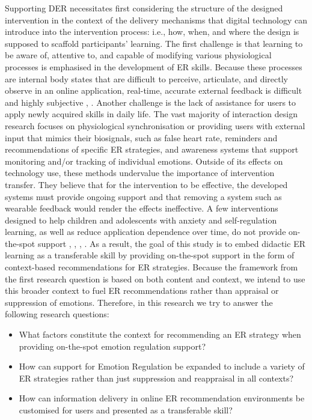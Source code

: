 Supporting DER necessitates first considering the structure of the designed intervention in the context of the delivery mechanisms that digital technology can introduce into the intervention process: i.e., how, when, and where the design is supposed to scaffold participants' learning. The first challenge is that learning to be aware of, attentive to, and capable of modifying various physiological processes is emphasised in the development of ER skills. Because these processes are internal body states that are difficult to perceive, articulate, and directly observe in an online application, real-time, accurate external feedback is difficult and highly subjective \cite{slovak2022designing}, \cite{tag2022emotion}. Another challenge is the lack of assistance for users to apply newly acquired skills in daily life. The vast majority of interaction design research focuses on physiological synchronisation or providing users with external input that mimics their biosignals, such as false heart rate, reminders and recommendations of specific ER strategies, and awareness systems that support monitoring and/or tracking of individual emotions. Outside of its effects on technology use, these methods undervalue the importance of intervention transfer. They believe that for the intervention to be effective, the developed systems must provide ongoing support and that removing a system such as wearable feedback would render the effects ineffective. A few interventions designed to help children and adolescents with anxiety and self-regulation learning, as well as reduce application dependence over time, do not provide on-the-spot support \cite{antle2018opening}, \cite{antle2019design}, \cite{scholten2016randomized}, \cite{slovak2016scaffolding}. As a result, the goal of this study is to embed didactic ER learning as a transferable skill by providing on-the-spot support in the form of context-based recommendations for ER strategies. Because the framework from the first research question is based on both content and context, we intend to use this broader context to fuel ER recommendations rather than appraisal or suppression of emotions. Therefore, in this research we try to answer the following research questions:
\begin{itemize}
    \item What factors constitute the context for recommending an ER strategy when providing on-the-spot emotion regulation support?
    \item How can support for Emotion Regulation be expanded to include a variety of ER strategies rather than just suppression and reappraisal in all contexts?
    \item How can information delivery in online ER recommendation environments be customised for users and presented as a transferable skill?
\end{itemize}


